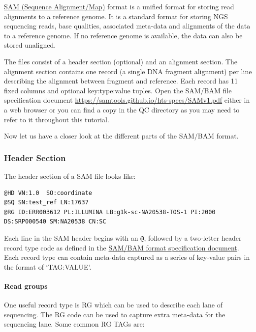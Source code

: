 \documentclass[11pt]{article}
\begin{document}
\href{https://samtools.github.io/hts-specs/SAMv1.pdf}{SAM (Sequence
Alignment/Map)} format is a unified format for storing read alignments
to a reference genome. It is a standard format for storing NGS
sequencing reads, base qualities, associated meta-data and alignments of
the data to a reference genome. If no reference genome is available, the
data can also be stored unaligned.

The files consist of a header section (optional) and an alignment
section. The alignment section contains one record (a single DNA
fragment alignment) per line describing the alignment between fragment
and reference. Each record has 11 fixed columns and optional
key:type:value tuples. Open the SAM/BAM file specification document
\url{https://samtools.github.io/hts-specs/SAMv1.pdf} either in a web
browser or you can find a copy in the QC directory as you may need to
refer to it throughout this tutorial.

Now let us have a closer look at the different parts of the SAM/BAM
format.

\hypertarget{header-section}{%
\subsubsection{Header Section}\label{header-section}}

The header section of a SAM file looks like:

\begin{verbatim}
@HD VN:1.0  SO:coordinate
@SQ SN:test_ref LN:17637
@RG ID:ERR003612 PL:ILLUMINA LB:g1k-sc-NA20538-TOS-1 PI:2000 DS:SRP000540 SM:NA20538 CN:SC
\end{verbatim}

Each line in the SAM header begins with an \texttt{@}, followed by a
two-letter header record type code as defined in the
\href{https://samtools.github.io/hts-specs/SAMv1.pdf}{SAM/BAM format
specification document}. Each record type can contain meta-data captured
as a series of key-value pairs in the format of `TAG:VALUE'.

\hypertarget{read-groups}{%
\paragraph{Read groups}\label{read-groups}}

One useful record type is RG which can be used to describe each lane of
sequencing. The RG code can be used to capture extra meta-data for the
sequencing lane. Some common RG TAGs are:
\end{document}
